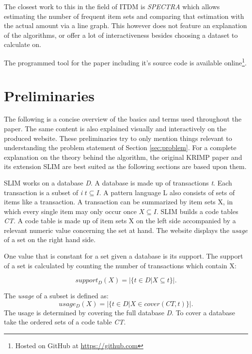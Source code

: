 \documentclass[runningheads]{llncs}
\begin{document}
The closest work to this in the field of ITDM is  \emph{SPECTRA}\cite{spectra} which allows estimating the number of frequent item sets and comparing that estimation with the actual amount via a line graph. This however does not feature an explanation of the algorithms, or offer a lot of interactiveness besides choosing a dataset to calculate on.

The programmed tool for the paper including it's source code is available online\footnote{Hosted on GitHub at \url{https://github.com}}.

\section{Preliminaries}
\label{sec:preliminaries}
The following is a concise overview of the basics and terms used throughout the paper. The same content is also explained visually and interactively on the produced website.
These preliminaries try to only mention things relevant to understanding the problem statement of Section \ref{sec:problem}.
For a complete explanation on the theory behind the algorithm, the original KRIMP paper\cite{krimp} and its extension SLIM\cite{slim} are best suited as the following sections are based upon them.


SLIM works on a database \emph{D}. A database is made up of transactions \emph{t}. Each transaction is a subset of \emph{i} $t\subseteq I$. A pattern language L also consists of sets of items like a transaction.
A transaction can be summarized by item sets X, in which every single item may only occur once $X \subseteq I$. 
SLIM builds a code tables \emph{CT}. A code table is made up of item sets X on the left side accompanied by a relevant numeric value concerning the set at hand. The website displays the \emph{usage} of a set on the right hand side.

One value that is constant for a set given a database is its support. The support of a set is calculated by counting the number of transactions which contain X:

\begin{equation}
\label{eq:support}
support_D(X) = |\{t \in D | X \subseteq t\}|.
\end{equation}


The \emph{usage} of a subset is defined as:
\begin{equation}
\label{eq:usage}
usage_D(X) = |\{t \in D | X \in cover(CT,t)\}|.
\end{equation}
The usage is determined by covering the full database \emph{D}.
To cover a database take the ordered sets of a code table \emph{CT}.
\end{document}
